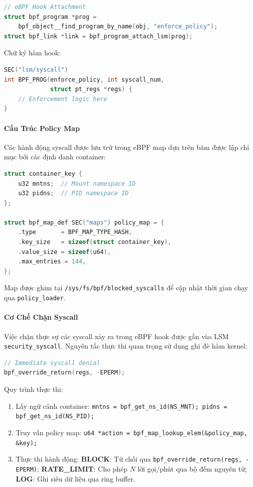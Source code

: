 \begin{lstlisting}[float=htbp, language=C, caption={Gắn LSM hook eBPF.}]
// eBPF Hook Attachment
struct bpf_program *prog =
    bpf_object__find_program_by_name(obj, "enforce_policy");
struct bpf_link *link = bpf_program_attach_lsm(prog);
\end{lstlisting}

Chữ ký hàm hook:
\begin{lstlisting}[float=htbp, language=C, caption={Chữ ký hàm LSM hook.}]
SEC("lsm/syscall")
int BPF_PROG(enforce_policy, int syscall_num,
             struct pt_regs *regs) {
    // Enforcement logic here
}
\end{lstlisting}

\paragraph{Cấu Trúc Policy Map}
Các hành động syscall được lưu trữ trong eBPF map dựa trên băm được lập chỉ mục bởi các định
danh container:

\begin{lstlisting}[float=htbp, language=C, caption={eBPF policy map theo khóa container.}]
struct container_key {
    u32 mntns;  // Mount namespace ID
    u32 pidns;  // PID namespace ID
};

struct bpf_map_def SEC("maps") policy_map = {
    .type       = BPF_MAP_TYPE_HASH,
    .key_size   = sizeof(struct container_key),
    .value_size = sizeof(u64),
    .max_entries = 144,
};
\end{lstlisting}

Map được ghim tại \texttt{/sys/fs/bpf/blocked\_syscalls} để cập nhật thời gian chạy qua
\texttt{policy\_loader}.

\paragraph{Cơ Chế Chặn Syscall}
Việc chặn thực sự các syscall xảy ra trong eBPF hook được gắn vào LSM
\texttt{security\_syscall}. Nguyên tắc thực thi quan trọng sử dụng ghi đè hàm kernel:
\begin{lstlisting}[float=htbp, language=C, caption={Chặn syscall qua ghi đè hàm kernel.}]
// Immediate syscall denial
bpf_override_return(regs, -EPERM);
\end{lstlisting}

Quy trình thực thi:
\begin{enumerate}
  \item Lấy ngữ cảnh container: \texttt{mntns = bpf\_get\_ns\_id(NS\_MNT);
        pidns = bpf\_get\_ns\_id(NS\_PID);}
  \item Truy vấn policy map: \texttt{u64 *action = bpf\_map\_lookup\_elem(\&policy\_map, \&key);}
  \item Thực thi hành động:
        \textbf{BLOCK}: Từ chối qua \texttt{bpf\_override\_return(regs, -EPERM)};
        \textbf{RATE\_LIMIT}: Cho phép $N$ lời gọi/phút qua bộ đếm nguyên tử;
        \textbf{LOG}: Ghi siêu dữ liệu qua ring buffer.
\end{enumerate}

